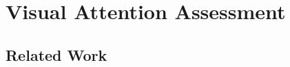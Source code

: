 \documentclass{sig-alternate}
\begin{document}
%
%
%



\section{Visual Attention Assessment}
\label{sec:vfoa}

\subsection{Related Work}
\end{document}
